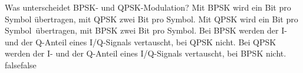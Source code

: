     {Was unterscheidet BPSK- und QPSK-Modulation?}
    {Mit BPSK wird ein Bit pro Symbol übertragen, mit QPSK zwei Bit pro Symbol.}
    {Mit QPSK wird ein Bit pro Symbol übertragen, mit BPSK zwei Bit pro Symbol.}
    {Bei BPSK werden der I- und der Q-Anteil eines I/Q-Signals vertauscht, bei QPSK nicht.}
    {Bei QPSK werden der I- und der Q-Anteil eines I/Q-Signals vertauscht, bei BPSK nicht.}
    {false}{false}